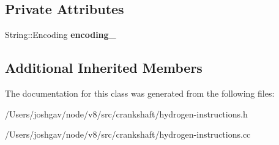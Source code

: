 \subsection*{Private Attributes}
\begin{DoxyCompactItemize}
\item 
String\+::\+Encoding {\bfseries encoding\+\_\+}\hypertarget{classv8_1_1internal_1_1_h_seq_string_get_char_ac23397625722e42c538fa4cc7c34e42c}{}\label{classv8_1_1internal_1_1_h_seq_string_get_char_ac23397625722e42c538fa4cc7c34e42c}

\end{DoxyCompactItemize}
\subsection*{Additional Inherited Members}


The documentation for this class was generated from the following files\+:\begin{DoxyCompactItemize}
\item 
/\+Users/joshgav/node/v8/src/crankshaft/hydrogen-\/instructions.\+h\item 
/\+Users/joshgav/node/v8/src/crankshaft/hydrogen-\/instructions.\+cc\end{DoxyCompactItemize}
